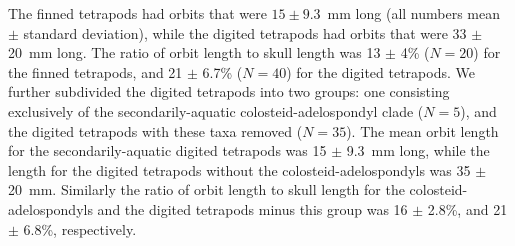  The finned tetrapods had orbits that were $15 \pm 9.3$~mm long (all numbers mean $\pm$ standard deviation), while the digited tetrapods had orbits that were 33 $\pm$ 20~mm long. The ratio of orbit length to skull length was 13 $\pm$ 4\% ($N=20$) for the finned tetrapods, and 21 $\pm$  6.7\% ($N=40$) for the digited tetrapods. We further subdivided the digited tetrapods into two groups: one consisting exclusively of the secondarily-aquatic colosteid-adelospondyl clade ($N=5$), and the digited tetrapods with these taxa removed ($N=35$). The mean orbit length for the secondarily-aquatic digited tetrapods was 15 $\pm$ 9.3~mm long, while the length for the digited tetrapods without the colosteid-adelospondyls was 35 $\pm$ 20~mm. Similarly the ratio of orbit length to skull length for the colosteid-adelospondyls and the digited tetrapods minus this group was 16 $\pm$ 2.8\%, and 21 $\pm$ 6.8\%, respectively.